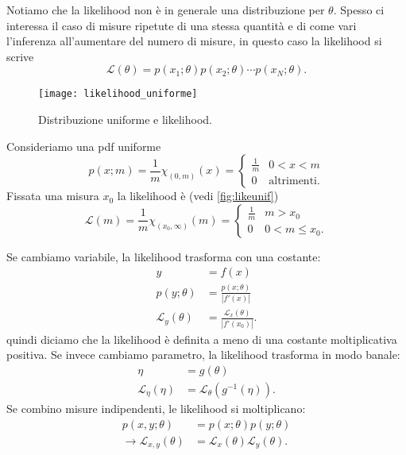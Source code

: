 Notiamo che la likelihood non è in generale una distribuzione per $\theta$.
Spesso ci interessa il caso di misure ripetute di una stessa quantità e di come vari l'inferenza all'aumentare del numero di misure, in questo caso la likelihood si scrive
\begin{equation*}
	\mathcal L(\theta) = p(x_1;\theta) p(x_2;\theta) \dotsm p(x_N;\theta).
\end{equation*}

\begin{example}
	\begin{figure}
		\centering
		\texttt{[image: likelihood\_uniforme]}
		\caption{\label{fig:likeunif}%
		Distribuzione uniforme e likelihood.}
	\end{figure}
	Consideriamo una pdf uniforme
	\begin{equation*}
		p(x;m)
		= \frac1m \chi_{(0,m)}(x)
		= \begin{cases}
			\frac 1m & 0<x<m \\
			0 & \text{altrimenti.}
		\end{cases}
	\end{equation*}
	Fissata una misura $x_0$ la likelihood è (vedi \autoref{fig:likeunif})
	\begin{equation*}
		\mathcal L(m)
		= \frac1m \chi_{(x_0,\infty)}(m)
		= \begin{cases}
			\frac 1m & m > x_0 \\
			0 & 0 < m \le x_0.
		\end{cases}
	\end{equation*}
\end{example}

Se cambiamo variabile, la likelihood trasforma con una costante:
\begin{align*}
	y &= f(x) \\
	p(y;\theta) &= \frac{p(x;\theta)}{|f'(x)|} \\
	\mathcal L_y(\theta) &= \frac{\mathcal L_x(\theta)}{|f'(x_0)|}.
\end{align*}
quindi diciamo che la likelihood è definita a meno di una costante moltiplicativa positiva.
Se invece cambiamo parametro, la likelihood trasforma in modo banale:
\begin{align*}
	\eta &= g(\theta) \\
	\mathcal L_\eta(\eta) &= \mathcal L_\theta(g^{-1}(\eta)).
\end{align*}
Se combino misure indipendenti, le likelihood si moltiplicano:
\begin{align*}
	p(x,y;\theta) &= p(x;\theta) p(y;\theta) \\
	\rightarrow \mathcal L_{x,y}(\theta) &= \mathcal L_x(\theta) \mathcal L_y(\theta).
\end{align*}


